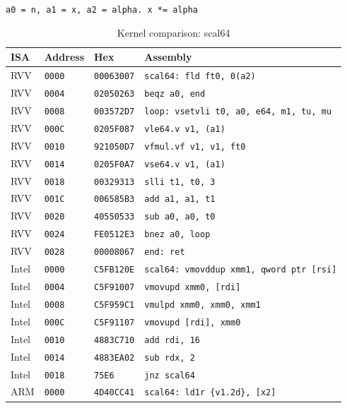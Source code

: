\begin{table}[htbp]
\centering
\caption{Kernel comparison: scal64}
\begingroup
\scriptsize
\setlength{\tabcolsep}{4pt}
\noindent \texttt{a0 = n, a1 = x, a2 = alpha. x *= alpha}\par
\vspace{0.6ex}
\begin{tabular}{@{}l|l|l|p{7.2cm}@{}}
\toprule
ISA & Address & Hex & Assembly \\
\midrule
RVV & \texttt{0000} & \texttt{00063007} & \texttt{scal64: fld ft0, 0(a2)} \\
RVV & \texttt{0004} & \texttt{02050263} & \texttt{beqz a0, end} \\
RVV & \texttt{0008} & \texttt{003572D7} & \texttt{loop: vsetvli t0, a0, e64, m1, tu, mu} \\
RVV & \texttt{000C} & \texttt{0205F087} & \texttt{vle64.v v1, (a1)} \\
RVV & \texttt{0010} & \texttt{921050D7} & \texttt{vfmul.vf v1, v1, ft0} \\
RVV & \texttt{0014} & \texttt{0205F0A7} & \texttt{vse64.v v1, (a1)} \\
RVV & \texttt{0018} & \texttt{00329313} & \texttt{slli t1, t0, 3} \\
RVV & \texttt{001C} & \texttt{006585B3} & \texttt{add a1, a1, t1} \\
RVV & \texttt{0020} & \texttt{40550533} & \texttt{sub a0, a0, t0} \\
RVV & \texttt{0024} & \texttt{FE0512E3} & \texttt{bnez a0, loop} \\
RVV & \texttt{0028} & \texttt{00008067} & \texttt{end: ret} \\
\midrule
Intel & \texttt{0000} & \texttt{C5FB120E} & \texttt{scal64: vmovddup xmm1, qword ptr [rsi]} \\
Intel & \texttt{0004} & \texttt{C5F91007} & \texttt{vmovupd xmm0, [rdi]} \\
Intel & \texttt{0008} & \texttt{C5F959C1} & \texttt{vmulpd xmm0, xmm0, xmm1} \\
Intel & \texttt{000C} & \texttt{C5F91107} & \texttt{vmovupd [rdi], xmm0} \\
Intel & \texttt{0010} & \texttt{4883C710} & \texttt{add rdi, 16} \\
Intel & \texttt{0014} & \texttt{4883EA02} & \texttt{sub rdx, 2} \\
Intel & \texttt{0018} & \texttt{75E6} & \texttt{jnz scal64} \\
\midrule
ARM & \texttt{0000} & \texttt{4D40CC41} & \texttt{scal64: ld1r \{v1.2d\}, [x2]} \\

\end{tabular}
\end{table}
